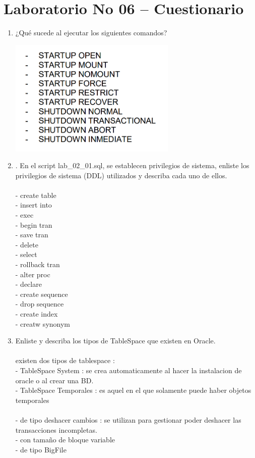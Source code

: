 \section{Laboratorio No 06 – Cuestionario} 

\begin{enumerate}[1.]
	\item ¿Qué sucede al ejecutar los siguientes comandos?
	\begin{center}
	\includegraphics[width=8cm]{./Imagenes/actividad_5_1_lab_06}
	\end{center}	

	\item . En el script lab\_02\_01.sql, se establecen privilegios de sistema, enliste los privilegios de sistema (DDL) utilizados y describa cada uno de ellos.
	\\\\- create table 
	\\- insert into
	\\- exec
	\\- begin tran
	\\- save tran
	\\- delete
	\\- select
	\\- rollback tran
	\\- alter proc
	\\- declare
	\\-  create sequence
	\\- drop sequence
	\\- create index
	\\- creatw synonym
	
	\item Enliste y describa los tipos de TableSpace que existen en Oracle.
	\\\\ existen dos tipos de tablespace :
	\\- TableSpace System	: se crea automaticamente al hacer la instalacion de oracle o al crear una BD.
	\\- TableSpace Temporales	: es aquel en el que solamente puede haber objetos temporales
	\\\\- de tipo deshacer cambios	: se utilizan para gestionar poder deshacer las transacciones incompletas.
	\\- con tamaño de bloque variable
	\\- de tipo BigFile	
	

\end{enumerate} 
